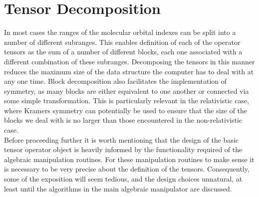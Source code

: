 \section{Tensor Decomposition}
\noindent In most cases the ranges of the molecular orbital indexes can be split into a
number of different subranges. This enables definition of each of the operator
tensors as the sum of a number of different blocks, each one associated with a
different combination of these subranges. Decomposing the tensors in this
manner reduces the maximum size of the data structure the computer has to deal
with at any one time. Block decomposition also facilitates the implementation
of symmetry, as many blocks are either equivalent to one another or connected
via some simple transformation. This is particularly relevant in the
relativistic case, where Kramers symmetry can potentially be used to ensure
that the size of the blocks we deal with is no larger than those encountered in
the non-relativistic case.\\

\noindent Before proceeding further it is worth mentioning that the design of
the basic tensor operator object is heavily informed by the functionality
required of the algebraic manipulation routines. For these manipulation 
routines to make sense it is necessary to be very precise about the 
definition of the tensors. Consequently, some of the exposition will 
seem tedious, and the design choices unnatural, at least until the algorithms in the main algebraic
manipulator are discussed.\\ 

